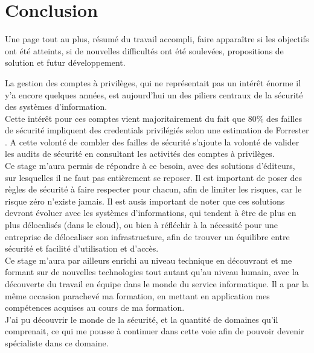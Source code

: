 \section*{Conclusion}

Une page tout au plus, résumé du travail accompli, faire apparaître si les objectifs ont été atteints, si de nouvelles difficultés ont été soulevées, propositions de solution et futur développement.

La gestion des comptes à privilèges, qui ne représentait pas un intérêt énorme il y'a encore quelques années, est aujourd'hui un des piliers centraux de la sécurité des systèmes d'information.\\
Cette intérêt pour ces comptes vient majoritairement du fait que 80\% des failles de sécurité impliquent des \glspl{credential} privilégiés selon une estimation de Forrester \cite{acs}. A cette volonté de combler des failles de sécurité s'ajoute la volonté de valider les audits de sécurité en consultant les activités des comptes à privilèges.\\
Ce stage m'aura permis de répondre à ce besoin, avec des solutions d'éditeurs, sur lesquelles il ne faut pas entièrement se reposer. Il est important de poser des règles de sécurité à faire respecter pour chacun, afin de limiter les risques, car le risque zéro n'existe jamais. Il est ausis important de noter que ces solutions devront évoluer avec les systèmes d'informations, qui tendent à être de plus en plus délocalisés (dans le cloud), ou bien à réfléchir à la nécessité pour une entreprise de délocaliser son infrastructure, afin de trouver un équilibre entre sécurité et facilité d'utilisation et d'accès.\\
Ce stage m'aura par ailleurs enrichi au niveau technique en découvrant et me formant sur de nouvelles technologies tout autant qu'au niveau humain, avec la découverte du travail en équipe dans le monde du service informatique. Il a par la même occasion parachevé ma formation, en mettant en application mes compétences acquises au cours de ma formation.\\
J'ai pu découvrir le monde de la sécurité, et la quantité de domaines qu'il comprenait, ce qui me pousse à continuer dans cette voie afin de pouvoir devenir spécialiste dans ce domaine.